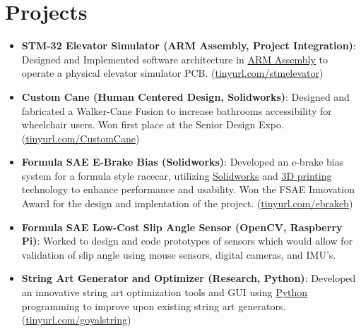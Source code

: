 \documentclass[letterpaper,10pt]{article}
\newcommand{\resumeItem}[2]{
  \item\small{
    \textbf{#1}{: #2 \vspace{-2pt}}
  }
}
\newcommand{\resumeSubItem}[2]{\resumeItem{#1}{#2}\vspace{-3pt}}
\newcommand{\resumeSubHeadingListStart}{\begin{itemize}[leftmargin=*]}
\newcommand{\resumeSubHeadingListEnd}{\end{itemize}}
\newcommand{\myLink}[1]{(\href{https://#1}{#1})}
\begin{document}
\section{Projects}
  \resumeSubHeadingListStart
    \resumeSubItem{STM-32 Elevator Simulator (ARM Assembly, Project Integration)}
    {Designed and Implemented software architecture in \underline{ARM Assembly} to operate a physical elevator simulator PCB. \myLink{tinyurl.com/stmelevator}}
\vspace{3pt}
    \resumeSubItem{Custom Cane (Human Centered Design, Solidworks)}
    {Designed and fabricated a Walker-Cane Fusion to increase bathrooms accessibility for wheelchair users. Won first place at the Senior Design Expo. \myLink{tinyurl.com/CustomCane}}
\vspace{3pt}
    \resumeSubItem{Formula SAE E-Brake Bias (Solidworks)}
    {Developed an e-brake bias system for a formula style racecar, utilizing \underline{Solidworks} and \underline{3D printing} technology to enhance performance and usability. Won the FSAE Innovation Award for the design and implentation of the project. \myLink{tinyurl.com/ebrakeb}}
\vspace{3pt}
    \resumeSubItem{Formula SAE Low-Cost Slip Angle Sensor (OpenCV, Raspberry Pi)}
    {Worked to design and code prototypes of sensors which would allow for validation of slip angle using mouse sensors, digital cameras, and IMU's.}
\vspace{3pt}
  \resumeSubItem{String Art Generator and Optimizer (Research, Python)}
    {Developed an innovative string art optimization tools and GUI using \underline{Python} programming to improve upon existing string art generators. \myLink{tinyurl.com/goyalstring}}
  \resumeSubHeadingListEnd
\vspace{-2pt}
\end{document}
